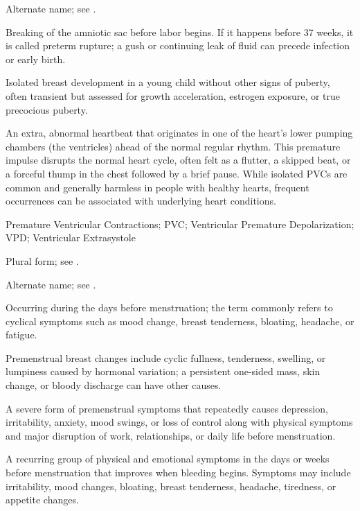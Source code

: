  Alternate name; see .

 Breaking of the amniotic sac before labor begins. If it happens before 37 weeks, it is called preterm rupture; a gush or continuing leak of fluid can precede infection or early birth.

 Isolated breast development in a young child without other signs of puberty, often transient but assessed for growth acceleration, estrogen exposure, or true precocious puberty.

 An extra, abnormal heartbeat that originates in one of the heart's lower pumping chambers (the ventricles) ahead of the normal regular rhythm. This premature impulse disrupts the normal heart cycle, often felt as a flutter, a skipped beat, or a forceful thump in the chest followed by a brief pause. While isolated PVCs are common and generally harmless in people with healthy hearts, frequent occurrences can be associated with underlying heart conditions.

\synonyms
Premature Ventricular Contractions; PVC; Ventricular Premature Depolarization; VPD; Ventricular Extrasystole

 Plural form; see .

 Alternate name; see .

 Occurring during the days before menstruation; the term commonly refers to cyclical symptoms such as mood change, breast tenderness, bloating, headache, or fatigue.

 Premenstrual breast changes include cyclic fullness, tenderness, swelling, or lumpiness caused by hormonal variation; a persistent one-sided mass, skin change, or bloody discharge can have other causes.

 A severe form of premenstrual symptoms that repeatedly causes depression, irritability, anxiety, mood swings, or loss of control along with physical symptoms and major disruption of work, relationships, or daily life before menstruation.

 A recurring group of physical and emotional symptoms in the days or weeks before menstruation that improves when bleeding begins. Symptoms may include irritability, mood changes, bloating, breast tenderness, headache, tiredness, or appetite changes.

